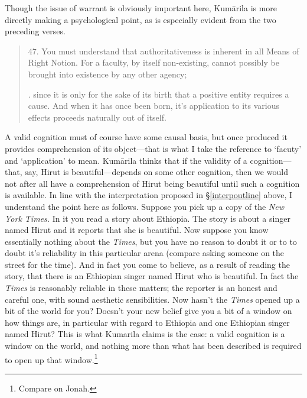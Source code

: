 ﻿\documentclass[11pt]{amsart}
\begin{document}
Though the issue of warrant is obviously important here, Kum\=arila is more directly making a psychological point, as is especially evident from the two preceding verses.\small \begin{quote}47. You must understand that authoritativeness is inherent in all Means of Right Notion. For a faculty, by itself non-existing, cannot possibly be brought into existence by any other agency;

. since it is only for the sake of its birth that a positive entity requires a cause. And when it has once been born, it's application to its various effects proceeds naturally out of itself.\end{quote}\normalsize A valid cognition must of course have some causal basis, but once produced it provides comprehension of its object---that is what I take the reference to `facuty' and `application' to mean. Kum\=arila thinks that if the validity of a cognition---that, say, Hirut is beautiful---depends on some other cognition, then we would not after all have a comprehension of Hirut being beautiful until such a cognition is available. In line with the interpretation proposed in \S\ref{interpoutline} above, I understand the point here as follows. Suppose you pick up a copy of the \emph{New York Times.} In it you read a story about Ethiopia. The story is about a singer named Hirut and it reports that she is beautiful. Now suppose you know essentially nothing about the \emph{Times}, but you have no reason to doubt it or to to doubt it's reliability in this particular arena (compare asking someone on the street for the time). And in fact you come to believe, as a result of reading the story, that there is an Ethiopian singer named Hirut who is beautiful. In fact the \emph{Times} is reasonably reliable in these matters; the reporter is an honest and careful one, with sound aesthetic sensibilities. Now hasn't the \emph{Times} opened up a bit of the world for you? Doesn't your new belief give you a bit of a window on how things are, in particular with regard to Ethiopia and one Ethiopian singer named Hirut? This is what Kumarila claims is the case: a valid cognition is a window on the world, and nothing more than what has been described is required to open up that window.\footnote{Compare \citet[pp.~XX]{kripke1972naming} on Jonah.}
\end{document}
